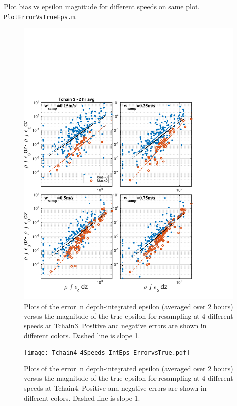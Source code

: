 \documentclass[11pt]{article}
\begin{document}
Plot bias vs epsilon magnitude for different speeds on same plot. \verb+PlotErrorVsTrueEps.m+.

\begin{figure}[htbp]
\includegraphics[scale=0.8]{Tchain3_4Speeds_IntEps_ErrorvsTrue.pdf}
\caption{Plots of the error in depth-integrated epsilon (averaged over 2 hours) versus the magnitude of the true epsilon for resampling at 4 different speeds at Tchain3. Positive and negative errors are shown in different colors. Dashed line is slope 1. }
\label{}
\end{figure}

\begin{figure}[htbp]
\texttt{[image: Tchain4\_4Speeds\_IntEps\_ErrorvsTrue.pdf]}
\caption{Plots of the error in depth-integrated epsilon (averaged over 2 hours) versus the magnitude of the true epsilon for resampling at 4 different speeds at Tchain4. Positive and negative errors are shown in different colors. Dashed line is slope 1. }
\label{}
\end{figure}
\end{document}

